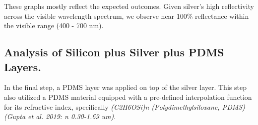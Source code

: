 These graphs mostly reflect the expected outcomes. Given silver's high reflectivity across the visible wavelength spectrum, we observe near 100\% reflectance within the visible range (400 - 700 nm).


\subsection{Analysis of Silicon plus Silver plus PDMS Layers.}
In the final step, a PDMS layer was applied on top of the silver layer. This step also utilized a PDMS material equipped with a pre-defined interpolation function for its refractive index, specifically \emph{(C2H6OSi)n (Polydimethylsiloxane, PDMS) (Gupta et al. 2019: n 0.30-1.69 um)}.

